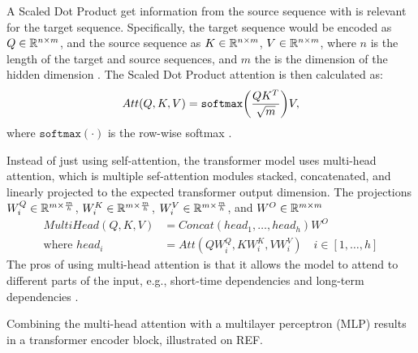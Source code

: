 A Scaled Dot Product get information from the source sequence with is relevant for the target sequence. Specifically, the target sequence would be encoded as \(Q \in \mathbb{R}^{n \times m}\), and the source sequence as \(K \in \mathbb{R}^{n \times m}\), \(V \in \mathbb{R}^{n \times m}\), where \(n\) is the length of the target and source sequences, and \(m\) the is the dimension of the hidden dimension \cite{}. 
The Scaled Dot Product attention is then calculated as:
\begin{align}
    Att(Q, K, V) = \texttt{softmax}\qty(\frac{QK^T}{\sqrt{m}})V,
\end{align} 
where \(\texttt{softmax}(\cdot)\) is the row-wise softmax \cite{}.

Instead of just using self-attention, the transformer model uses multi-head attention, which is multiple sef-attention modules stacked, concatenated, and linearly projected to the expected transformer output dimension. The projections \(W_i^Q \in \mathbb{R}^{m\times \frac{m}{h}}\), \(W_i^K \in \mathbb{R}^{m\times \frac{m}{h}}\), \(W_i^V \in \mathbb{R}^{m\times \frac{m}{h}}\), and \(W^O \in \mathbb{R}^{m\times m}\)
\begin{align}
    MultiHead(Q, K, V) &= Concat(head_1, \dots, head_h)W^O \\
    \text{where } head_i &= Att(QW^Q_i, KW^K_i, VW^V_i) \quad i\in [1, \dots, h]
\end{align}
The pros of using multi-head attention is that it allows the model to attend to different parts of the input, e.g., short-time dependencies and long-term dependencies \cite{}. 

Combining the multi-head attention with a multilayer perceptron (MLP) results in a transformer encoder block, illustrated on REF. %



